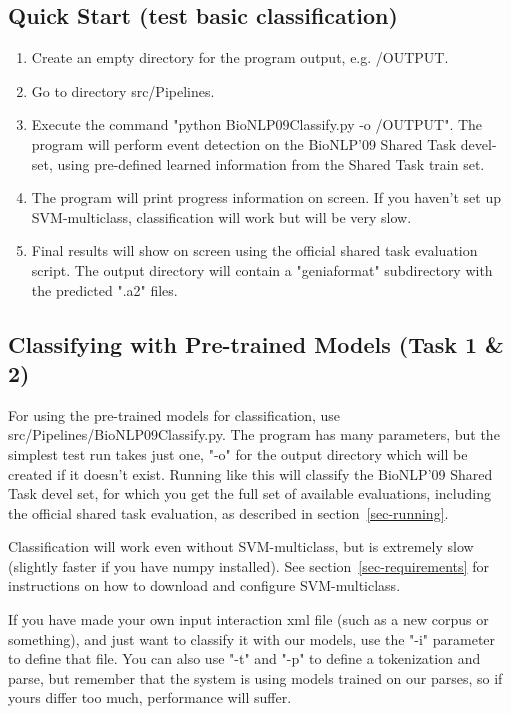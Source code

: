 \documentclass[a4paper,12pt]{article}
\begin{document}
\subsection{Quick Start (test basic classification)}

\begin{enumerate}

\item Create an empty directory for the program output, e.g. /OUTPUT.

\item Go to directory src/Pipelines.

\item Execute the command "python BioNLP09Classify.py -o /OUTPUT". The program will
perform event detection on the BioNLP'09 Shared Task devel-set, using pre-defined
learned information from the Shared Task train set.

\item The program will print progress information on screen. If you haven't set up
SVM-multiclass, classification will work but will be very slow.

\item Final results will show on screen using the official shared task evaluation
script. The output directory will contain a "geniaformat" subdirectory with the
predicted ".a2" files.

\end{enumerate}

\subsection{Classifying with Pre-trained Models (Task 1 \& 2)}

For using the pre-trained models for classification, use
src/Pipelines/BioNLP09Classify.py. The program has many parameters, but the
simplest test run takes just one, "-o" for the output directory which will be
created if it doesn't exist. Running like this will classify the BioNLP'09 Shared
Task devel set, for which you get the full set of available evaluations,
including the official shared task evaluation, as described in
section~\ref{sec-running}.

Classification will work even without SVM-multiclass, but is extremely slow
(slightly faster if you have numpy installed). See
section~\ref{sec-requirements} for instructions on how to download and configure SVM-multiclass.

If you have made your own input interaction xml file (such as a new corpus or
something), and just want to classify it with our models, use the "-i" parameter
to define that file. You can also use "-t" and "-p" to define a tokenization and
parse, but remember that the system is using models trained on our parses, so if
yours differ too much, performance will suffer.
\end{document}
